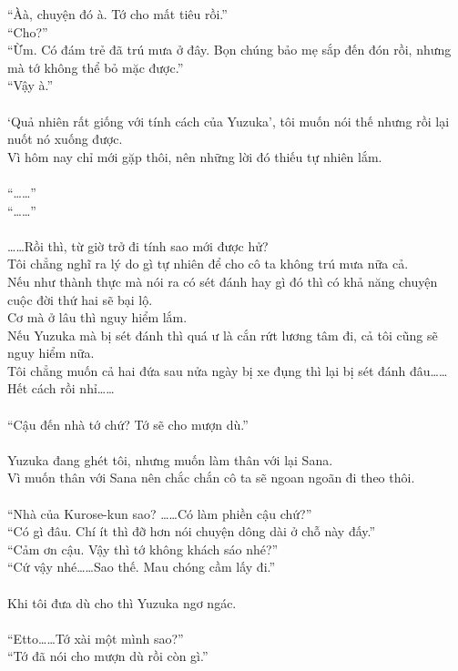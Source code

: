 \documentclass[12pt,a4paper, twosides]{book}
\begin{document}
“Àà, chuyện đó à. Tớ cho mất tiêu rồi.”\\
“Cho?”\\
“Ừm. Có đám trẻ đã trú mưa ở đây. Bọn chúng bảo mẹ sắp đến đón rồi, nhưng mà tớ không thể bỏ mặc được.”\\
“Vậy à.”\\
\\
‘Quả nhiên rất giống với tính cách của Yuzuka’, tôi muốn nói thế nhưng rồi lại nuốt nó xuống được.\\
Vì hôm nay chỉ mới gặp thôi, nên những lời đó thiếu tự nhiên lắm.\\
\\
“……”\\
“……”\\
\\
……Rồi thì, từ giờ trở đi tính sao mới được hử?\\
Tôi chẳng nghĩ ra lý do gì tự nhiên để cho cô ta không trú mưa nữa cả.\\
Nếu như thành thực mà nói ra có sét đánh hay gì đó thì có khả năng chuyện cuộc đời thứ hai sẽ bại lộ.\\
Cơ mà ở lâu thì nguy hiểm lắm.\\
Nếu Yuzuka mà bị sét đánh thì quá ư là cắn rứt lương tâm đi, cả tôi cũng sẽ nguy hiểm nữa.\\
Tôi chẳng muốn cả hai đứa sau nửa ngày bị xe đụng thì lại bị sét đánh đâu……\\
Hết cách rồi nhỉ……\\
\\
“Cậu đến nhà tớ chứ? Tớ sẽ cho mượn dù.”\\
\\
Yuzuka đang ghét tôi, nhưng muốn làm thân với lại Sana.\\
Vì muốn thân với Sana nên chắc chắn cô ta sẽ ngoan ngoãn đi theo thôi.\\
\\
“Nhà của Kurose-kun sao? ……Có làm phiền cậu chứ?”\\
“Có gì đâu. Chí ít thì đỡ hơn nói chuyện dông dài ở chỗ này đấy.”\\
“Cảm ơn cậu. Vậy thì tớ không khách sáo nhé?”\\
“Cứ vậy nhé……Sao thế. Mau chóng cầm lấy đi.”\\
\\
Khi tôi đưa dù cho thì Yuzuka ngơ ngác.\\
\\
“Etto……Tớ xài một mình sao?”\\
“Tớ đã nói cho mượn dù rồi còn gì.”\\
\end{document}
